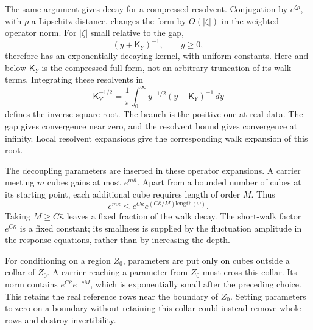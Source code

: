\documentclass[11pt,letterpaper,reqno]{amsart}
\theoremstyle{definition}
\theoremstyle{remark}
\begin{document}
The same argument gives decay for a compressed resolvent.
Conjugation by $e^{\zeta\rho}$, with $\rho$ a Lipschitz distance,
changes the form by $O(|\zeta|)$ in the weighted operator norm.
For $|\zeta|$ small relative to the gap,
\[
 (y+\mathsf K_Y)^{-1},\qquad y\ge0,
\]
therefore has an exponentially decaying kernel, with uniform
constants. Here and below $\mathsf K_Y$ is the compressed full
form, not an arbitrary truncation of its walk terms. Integrating
these resolvents in
\begin{equation}\label{eq:deep-inverse-root}
 \mathsf K_Y^{-1/2}
      =\frac1\pi\int_0^\infty
                   y^{-1/2}(y+\mathsf K_Y)^{-1}\,dy
\end{equation}
defines the inverse square root. The branch is the positive
one at real data. The gap gives convergence near zero, and the
resolvent bound gives convergence at infinity. Local resolvent
expansions give the corresponding walk expansion of this root.

The decoupling parameters are inserted in these operator
expansions. A carrier meeting $m$ cubes gains at most
$e^{m\bar\kappa}$. Apart from a bounded number of cubes at its
starting point, each additional cube requires length of order
$M$. Thus
\[
 e^{m\bar\kappa}
 \le e^{C\bar\kappa}
       e^{(C\bar\kappa/M)\mathrm{length}(\omega)}.
\]
Taking $M\ge C\bar\kappa$ leaves a fixed fraction of the walk
decay. The short-walk factor $e^{C\bar\kappa}$ is a fixed
constant; its smallness is supplied by the fluctuation amplitude
in the response equations, rather than by increasing the depth.

For conditioning on a region $Z_0$, parameters are put only on
cubes outside a collar of $Z_0$. A carrier reaching a parameter
from $Z_0$ must cross this collar. Its norm contains
$e^{C\bar\kappa}e^{-cM}$, which is exponentially small after
the preceding choice. This retains the real reference rows near
the boundary of $Z_0$. Setting parameters to zero on a boundary
without retaining this collar could instead remove whole rows
and destroy invertibility.
\end{document}
